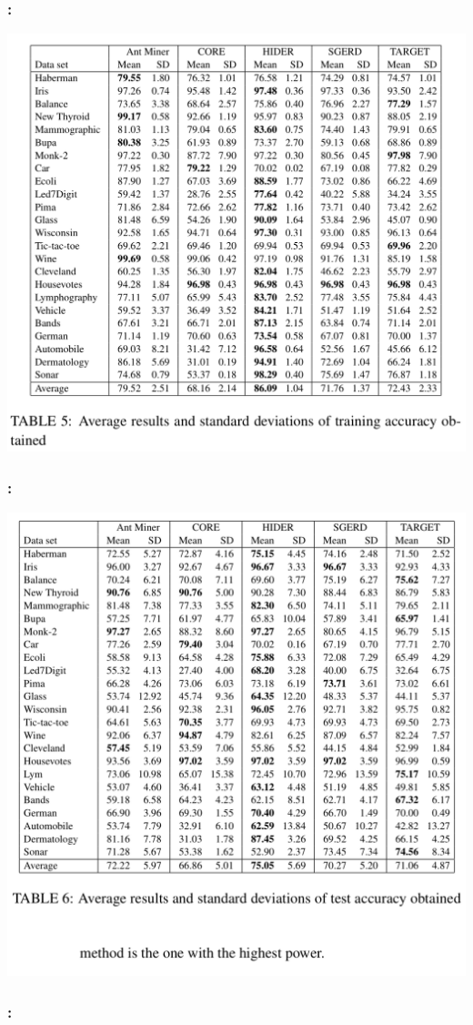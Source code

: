 \documentclass{beamer}
\begin{document}
\begin{CJK*}{UTF8}{bsmi}
\begin{frame}
	\frametitle{\insertsection : \insertsubsection}
	
	\begin{center}
		\includegraphics[width=.65\linewidth]{./10.png}
	\end{center}
\end{frame}


\begin{frame}
	\frametitle{\insertsection : \insertsubsection}
	
	\begin{center}
		\includegraphics[width=.6\linewidth]{./11.png}
	\end{center}
\end{frame}


\begin{frame}
	\frametitle{\insertsection : \insertsubsection}


\end{frame}
\end{CJK*}
\end{document}

